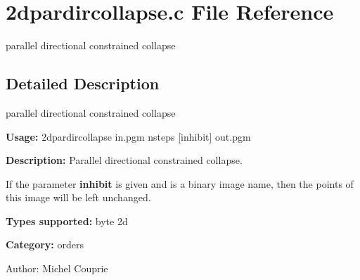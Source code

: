 \section{2dpardircollapse.c File Reference}
\label{2dpardircollapse_8c}
parallel directional constrained collapse 



\subsection{Detailed Description}
parallel directional constrained collapse 

{\bf Usage:} 2dpardircollapse in.pgm nsteps [inhibit] out.pgm

{\bf Description:} Parallel directional constrained collapse.

If the parameter {\bf inhibit} is given and is a binary image name, then the points of this image will be left unchanged.

{\bf Types supported:} byte 2d

{\bf Category:} orders

\begin{Desc}
\item[Author:]Michel Couprie \end{Desc}

